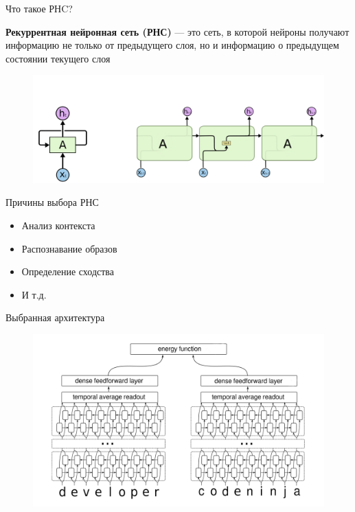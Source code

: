 \documentclass[russian,ignorenonframetext,]{beamer}
\providecommand{\tightlist}{%
  \setlength{\itemsep}{0pt}\setlength{\parskip}{0pt}}
\renewcommand{\caption}[1]{}
\begin{document}
\begin{frame}{Что такое РНC?}
\protect\hypertarget{ux447ux442ux43e-ux442ux430ux43aux43eux435-ux440ux43dc}{}

\textbf{Рекуррентная нейронная сеть (РНС)} --- это сеть, в которой
нейроны получают информацию не только от предыдущего слоя, но и
информацию о предыдущем состоянии текущего слоя

\begin{figure}
\centering
\includegraphics{rnn}
\caption{RNN}
\end{figure}

\end{frame}

\begin{frame}{Причины выбора РНС}
\protect\hypertarget{ux43fux440ux438ux447ux438ux43dux44b-ux432ux44bux431ux43eux440ux430-ux440ux43dux441}{}

\begin{itemize}
\tightlist
\item
  Анализ контекста
\item
  Распознавание образов
\item
  Определение сходства
\item
  И т.д.
\end{itemize}

\end{frame}

\begin{frame}{Выбранная архитектура}
\protect\hypertarget{ux432ux44bux431ux440ux430ux43dux43dux430ux44f-ux430ux440ux445ux438ux442ux435ux43aux442ux443ux440ux430}{}

\begin{figure}
\centering
\includegraphics{siam}
\caption{siam}
\end{figure}

\end{frame}
\end{document}
